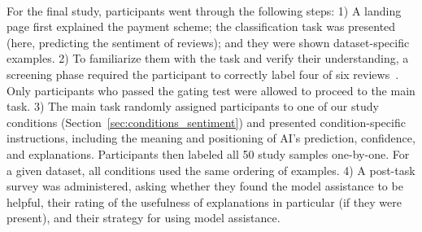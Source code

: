 \paragraph{}
For the final study, participants went through the following steps:
1) 
A landing page first explained the payment scheme; the classification task was presented (here, predicting the sentiment of reviews); and they were shown dataset-specific examples. 
2) To familiarize them with the task and verify their understanding, a screening phase required the participant to correctly label four of six reviews~\cite{liu-naacl16}.
Only participants who passed the gating test were allowed to proceed to the main task.
3) The main task randomly assigned participants to one of our study conditions (Section~\ref{sec:conditions_sentiment}) and presented condition-specific instructions, including the meaning and positioning of AI's prediction, confidence, and explanations.
Participants then labeled all 50 study samples one-by-one. 
For a given dataset, all conditions used the same ordering of examples.
4) A post-task survey was administered, asking whether they found the model assistance to be helpful, their rating of the usefulness of explanations in particular (if they were present), and their strategy for using model assistance.




